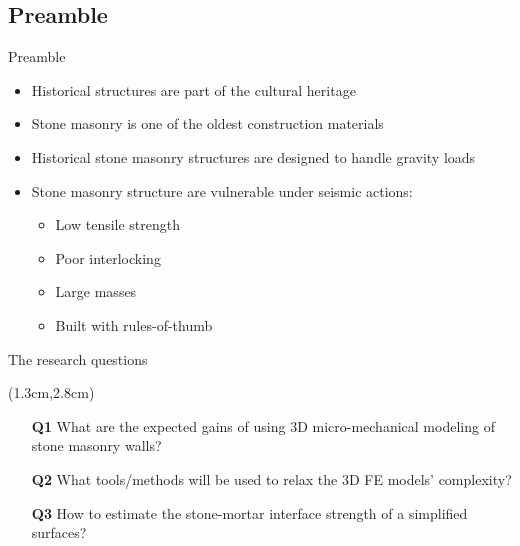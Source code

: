 \documentclass{EESD}
\begin{document}
\subsection{Preamble}
\begin{frame}[t]{Preamble}\vspace{4pt}
\begin{itemize}
    \item Historical structures are part of the cultural heritage\vspace{10pt}\pause
    \item Stone masonry is one of the oldest construction materials\vspace{10pt}\pause
    \item Historical stone masonry structures are designed to handle gravity loads\vspace{10pt}\pause
    \item Stone masonry structure are vulnerable under seismic actions:\vspace{5pt}
    \begin{itemize}
        \item Low tensile strength
        \item Poor interlocking
        \item Large masses
        \item Built with rules-of-thumb
    \end{itemize}
\end{itemize}
\end{frame}



\begin{frame}[t]{The research questions}\vspace{10pt}
    \begin{textblock*}{13cm}(1.3cm,2.8cm)
        \begin{itemize}
            \item[\textbf{Q1}] What are the expected gains of using 3D micro-mechanical modeling of stone masonry walls?\vspace{10pt}\pause
            \item[\textbf{Q2}] What tools/methods will be used to relax the 3D FE models' complexity?\vspace{20pt}\pause
            \item[\textbf{Q3}] How to estimate the stone-mortar interface strength of a simplified surfaces?
        \end{itemize}
    \end{textblock*}
\end{frame}
\end{document}
